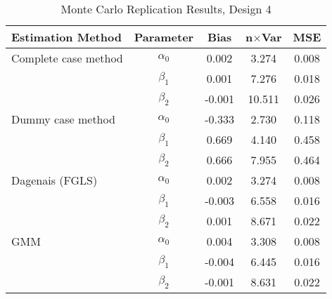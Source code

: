 \begin{table}
\centering
\caption{Monte Carlo Replication Results, Design 4}
\label{table:MCReplicationResultsDesign4}
\begin{tabular}{lcccc}
\toprule
Estimation Method & Parameter & Bias & n$\times$Var & MSE \\
\midrule
Complete case method & $\alpha_0$ & 0.002 & 3.274 & 0.008 \\
 & $\beta_1$ & 0.001 & 7.276 & 0.018 \\
 & $\beta_2$ & -0.001 & 10.511 & 0.026 \\
Dummy case method & $\alpha_0$ & -0.333 & 2.730 & 0.118 \\
 & $\beta_1$ & 0.669 & 4.140 & 0.458 \\
 & $\beta_2$ & 0.666 & 7.955 & 0.464 \\
Dagenais (FGLS) & $\alpha_0$ & 0.002 & 3.274 & 0.008 \\
 & $\beta_1$ & -0.003 & 6.558 & 0.016 \\
 & $\beta_2$ & 0.001 & 8.671 & 0.022 \\
GMM & $\alpha_0$ & 0.004 & 3.308 & 0.008 \\
 & $\beta_1$ & -0.004 & 6.445 & 0.016 \\
 & $\beta_2$ & -0.001 & 8.631 & 0.022 \\
\bottomrule
\end{tabular}
\end{table}

